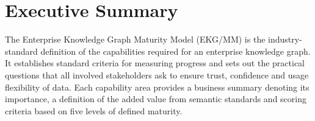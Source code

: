 \section{Executive Summary}

The Enterprise Knowledge Graph Maturity Model (EKG/MM) is the industry-standard definition of the capabilities
required for an enterprise knowledge graph.
It establishes standard criteria for measuring progress and sets out the practical questions that all involved
stakeholders ask to ensure trust, confidence and usage flexibility of data.
Each capability area provides a business summary denoting its importance, a definition of the added value from
semantic standards and scoring criteria based on five levels of defined maturity.

